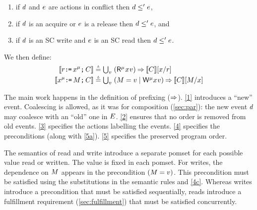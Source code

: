 \begin{candidate}
\begin{enumerate}
\item[{\labeltextsc[P5b]{(P5b)}{5b}}]
  if $d$ and $e$ are \external actions in conflict then $d\le'e$, %
\item[{\labeltextsc[P5c]{(P5c)}{5c}}]
  if $d$ is an acquire or $e$ is a release then $d \le' e$, and
\item[{\labeltextsc[P5d]{(P5d)}{5d}}]
  if $d$ is an SC write and $e$ is an SC read then $d \le' e$.
\end{enumerate}
  We then define:
  \begin{gather*}
    \begin{aligned}[t]
      \sem{\aReg\GETS\aLoc^\amode\SEMI \aCmd} & \eqdef \textstyle\bigcup_\aVal\;
      (\DRmode\aLoc\aVal) \prefix \sem{\aCmd} [\aLoc/\aReg]
      \\
      \sem{\aLoc^\amode\GETS\aExp\SEMI \aCmd} & \eqdef
      \textstyle\bigcup_\aVal\; (\aExp=\aVal \mid \DWmode\aLoc\aVal)
      \prefix \sem{\aCmd}[\aExp/\aLoc]
    \end{aligned}
  \end{gather*}
\end{candidate}

The main work happens in the definition of prefixing ($\mathbin\Rightarrow$).  \ref{1}
introduces a ``new'' event.  Coalescing is allowed, as it was for composition
(\textsection\ref{sec:par}): the new event $d$ may coalesce with an
``old'' one in $E$.  \ref{2} ensures that no order is removed from old
events.  \ref{3} specifies the actions labelling the events.  \ref{4}
specifies the preconditions (along with \ref{5a}).  \ref{5} specifies the
preserved program order.

The semantics of read and write introduce a separate pomset for each possible
value read or written.  The value is fixed in each pomset.  For writes, the
dependence on $M$ appears in the precondition $(M=v)$.  This
precondition must be satisfied using the substitutions in the semantic rules
and \ref{4c}.  Whereas writes introduce a precondition that must be satisfied
sequentially, reads introduce a fulfillment requirement
(\textsection\ref{sec:fulfillment}) that must be satisfied concurrently.

